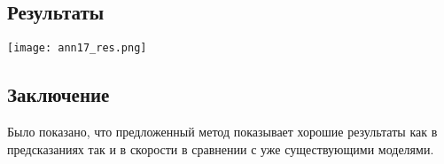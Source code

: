 \subsection*{Результаты}
\begin{minipage}{1.0\linewidth}
    \begin{center}
        \texttt{[image: ann17\_res.png]} \\
    \end{center}
    
\end{minipage} 
\subsection*{Заключение}
Было показано, что предложенный метод показывает хорошие результаты как в предсказаниях так и в скорости в сравнении с 
уже существующими моделями.